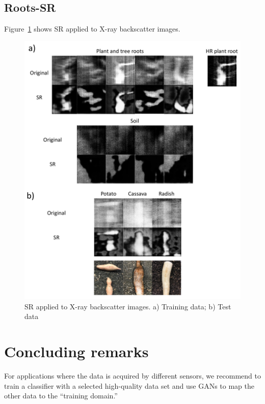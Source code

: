 \documentclass[10pt,twocolumn,letterpaper]{article}
\begin{document}
\subsection{Roots-SR}


Figure~\ref{fig:srtest} shows SR applied to X-ray backscatter images.

\begin{figure}[h]
\begin{center}
\includegraphics[scale=0.70]{results/srxray.pdf}
\end{center}
   \caption{SR applied to X-ray backscatter images. a) Training data; b) Test data}
\label{fig:srtest}
\end{figure}

\section{Concluding remarks}

For applications where the data is acquired by different sensors, we recommend to train a classifier with a selected high-quality data set and use GANs to map the other data to the ``training domain.''


{\small


}
\end{document}
